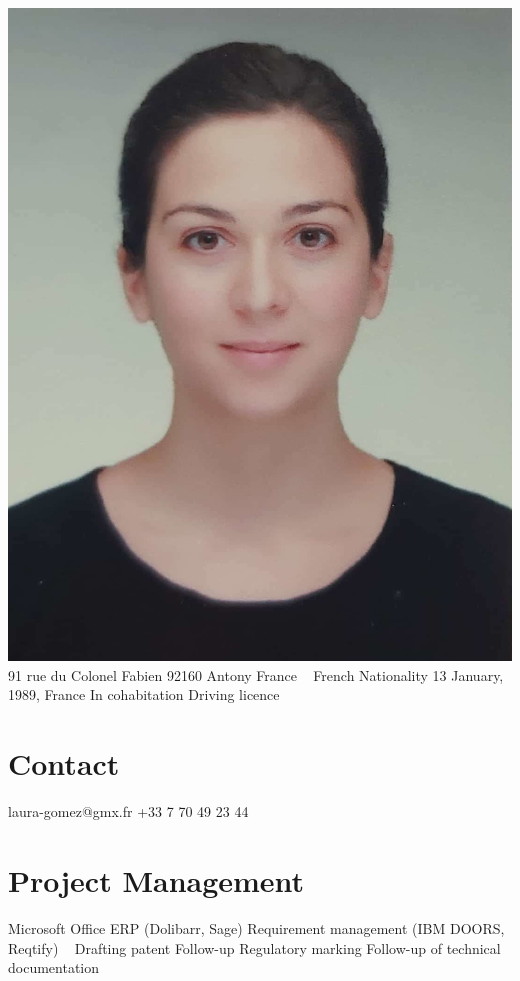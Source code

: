 \documentclass{cv-style}     %
\begin{document}


\begin{aside}
    \includegraphics[width=.8\columnwidth]{img/LG}
    91 rue du Colonel Fabien
    92160 Antony
    France
    ~
    French Nationality
    13 January, 1989, France
    In cohabitation
    Driving licence
    \section{Contact}
    laura-gomez@gmx.fr
    +33 7 70 49 23 44    
    \section{Project Management}
    Microsoft Office
    ERP (Dolibarr, Sage)
    Requirement management (IBM DOORS, Reqtify)
    ~
    Drafting patent
    Follow-up Regulatory marking
    Follow-up of technical documentation

\end{aside}
\end{document}
